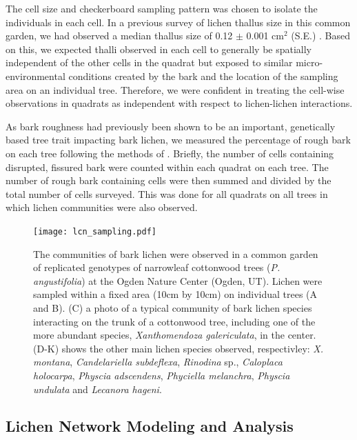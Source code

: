 \documentclass[9pt,twocolumn,twoside,lineno]{pnas-new}
\begin{document}
{The cell size and checkerboard sampling pattern was chosen to isolate
the individuals in each cell. In a previous survey of lichen thallus
size in this common garden, we had observed a median thallus size of
0.12 $\pm$ 0.001 cm$^2$ (S.E.) \cite{Lamit2015}. Based on this, we
expected thalli observed in each cell to generally be spatially
independent of the other cells in the quadrat but exposed to similar
micro-environmental conditions created by the bark and the location of
the sampling area on an individual tree. Therefore, we were confident
in treating the cell-wise observations in quadrats as independent with
respect to lichen-lichen interactions.

As bark roughness had previously been shown to be an important,
genetically based tree trait impacting bark lichen, we measured the
percentage of rough bark on each tree following the methods of
\citep{Lamit2012}. Briefly, the number of cells containing disrupted,
fissured bark were counted within each quadrat on each tree. The
number of rough bark containing cells were then summed and divided by
the total number of cells surveyed. This was done for all quadrats on
all trees in which lichen communities were also observed.


\begin{figure}[ht]
\centering
\texttt{[image: lcn\_sampling.pdf]}
\caption{The communities of bark lichen were observed in a common
  garden of replicated genotypes of narrowleaf cottonwood trees
  (\textit{P. angustifolia}) at the Ogden Nature Center (Ogden,
  UT). Lichen were sampled within a fixed area (10cm by 10cm) on
  individual trees (A and B). (C) a photo of a typical community of
  bark lichen species interacting on the trunk of a cottonwood tree,
  including one of the more abundant species, \textit{Xanthomendoza
    galericulata}, in the center. (D-K) shows the other main lichen
  species observed, respectivley: \textit{X. montana},
  \textit{Candelariella subdeflexa}, \textit{Rinodina} sp.,
  \textit{Caloplaca holocarpa}, \textit{Physcia adscendens},
  \textit{Phyciella melanchra}, \textit{Physcia undulata} and
  \textit{Lecanora hageni}.}
\label{fig:lichen_sampling}
\end{figure}

\subsection*{Lichen Network Modeling and Analysis}

}
\end{document}
